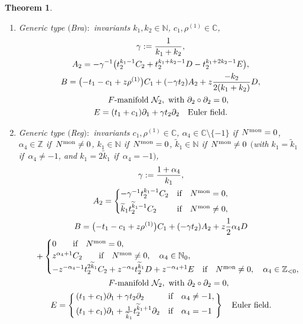 \documentclass[10pt,a4paper]{amsart}
\numberwithin{equation}{section}
\numberwithin{figure}{section}
\newcommand{\N}{{\mathbb N}}
\newcommand{\Z}{{\mathbb Z}}
\newcommand{\C}{{\mathbb C}}
\newcommand{\NN}{{\mathcal N}}
\newcommand{\www}{\widetilde}
\newcommand{\paa}{\partial}
\newtheorem{Theorem}{Theorem}[section]
\begin{document}
\begin{Theorem}
\begin{enumerate}
\begin{enumerate}
\item[$(ii)$] Generic type $($Bra$){:}$ invariants $k_1,k_2\in\N$,
$c_1,\rho^{(1)}\in\C$,
\begin{gather*}%
\gamma := \frac{1}{k_1+k_2},
\\
A_2=-\gamma^{-1}\big(t_2^{k_1-1}C_2+t_2^{k_1+k_2-1}D-t_2^{k_1+2k_2-1}E\big),
\\
B= \big({-}t_1-c_1+z\rho^{(1)}\big)C_1+(-\gamma t_2)A_2+ z\frac{-k_2}{2(k_1+k_2)}D,
\\ \hphantom{B= }
\text{$F$-manifold }\NN_2,
\text{ with }\paa_2\circ\paa_2=0,
\\
E= (t_1+c_1)\paa_1 +\gamma t_2\paa_2\quad\text{Euler field}.
\end{gather*}

\item[$(iii)$] Generic type $($Reg$){:}$
invariants $c_1,\rho^{(1)}\in\C$,
$\alpha_4\in\C\setminus\{-1\}$ if~$N^{\rm mon}=0$,
$\alpha_4\in\Z$ if~$N^{\rm mon}\neq 0$,
$k_1\in\N$ if~$N^{\rm mon}=0$,
$\www k_1\in\N$ if~$N^{\rm mon}\neq 0$
$($with $k_1=\www k_1$ if~$\alpha_4\neq -1$,
and $k_1=2\www k_1$ if~$\alpha_4=-1)$,
\begin{gather*}%
\gamma := \frac{1+\alpha_4}{k_1},
\\
A_2=\begin{cases}
-\gamma^{-1}t_2^{k_1-1}C_2&\text{if}\quad N^{\rm mon}=0,
\\[.5ex]
\www k_1t_2^{\www k_1-1}C_2&\text{if}\quad N^{\rm mon}\neq 0,
\end{cases}
\\
B= \big({-}t_1-c_1+z\rho^{(1)}\big)C_1+(-\gamma t_2)A_2+z\frac{1}{2}\alpha_4 D
\\ \hphantom{B= }
{}+ \begin{cases}
0 \qquad\text{if}\quad N^{\rm mon}=0,
\\
z^{\alpha_4+1}C_2\qquad\text{if}\quad N^{\rm mon}\neq 0,\quad
\alpha_4\in\N_0,
\\
-z^{-\alpha_4-1}t_2^{2\www k_1}C_2 +z^{-\alpha_4}t_2^{\www k_1}D+
z^{-\alpha_4+1}E\quad\text{if}\quad N^{\rm mon}\neq 0,\quad
\alpha_4\in\Z_{<0},\!\!\!\!\end{cases}
\\ \hphantom{B= }
\text{$F$-manifold }\NN_2,\
\text{with}\ \paa_2\circ\paa_2=0,
\\
E= \left\{\!\!\begin{array}{ll}
(t_1+c_1)\paa_1 +\gamma t_2\paa_2&\text{if}\quad\alpha_4\neq -1,\\[.5ex]
(t_1+c_1)\paa_1 +\frac{1}{\www k_1}t_2^{\www k_1+1} \paa_2
&\text{if}\quad\alpha_4=-1\end{array}\!\!\right\}
\quad\text{Euler field}.
\end{gather*}


\end{enumerate}
\end{enumerate}
\end{Theorem}
\end{document}
